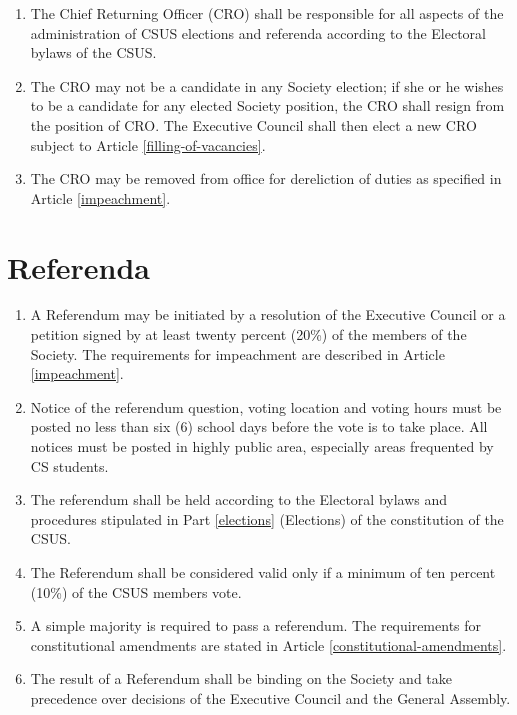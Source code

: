 \begin{enumerate}
\def\labelenumi{\arabic{enumi}.}
\item
  The Chief Returning Officer (CRO) shall be responsible for all aspects
  of the administration of CSUS elections and referenda according to the
  Electoral bylaws of the CSUS.
\item
  The CRO may not be a candidate in any Society election; if she or he wishes
  to be a candidate for any elected Society position, the CRO shall
  resign from the position of CRO. The Executive Council shall then
  elect a new CRO subject to Article \ref{filling-of-vacancies}.
\item
  The CRO may be removed from office for dereliction of duties as
  specified in Article \ref{impeachment}.
\end{enumerate}

\section{Referenda}\label{referenda}

\begin{enumerate}
\def\labelenumi{\arabic{enumi}.}
\item
  A Referendum may be initiated by a resolution of the Executive Council
  or a petition signed by at least twenty percent (20\%) of the members
  of the Society. The requirements for impeachment are described in
  Article \ref{impeachment}.
\item
  Notice of the referendum question, voting location and voting hours
  must be posted no less than six (6) school days before the vote is to
  take place. All notices must be posted in highly public area,
  especially areas frequented by CS students.
\item
  The referendum shall be held according to the Electoral bylaws and
  procedures stipulated in Part \ref{elections} (Elections) of the constitution of
  the CSUS.
\item
  The Referendum shall be considered valid only if a minimum of ten
  percent (10\%) of the CSUS members vote.
\item
  A simple majority is required to pass a referendum. The requirements
  for constitutional amendments are stated in Article \ref{constitutional-amendments}.
\item
  The result of a Referendum shall be binding on the Society and take
  precedence over decisions of the Executive Council and the General
  Assembly.
\end{enumerate}

